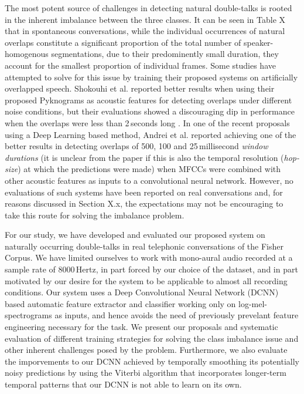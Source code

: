 \documentclass[a4paper]{article}
\begin{document}
The most potent source of challenges in detecting natural double-talks is rooted in the inherent imbalance between the three classes.
It can be seen in Table X that in spontaneous conversations,  %
while the individual occurrences of natural overlaps constitute a significant proportion of the total number of speaker-homogenous segmentations,
due to their predominently small duration, they account for the smallest proportion of individual frames.
Some studies have attempted to solve for this issue by training their proposed systems on artificially overlapped speech.  %
Shokouhi et al. reported better results when using their proposed Pyknograms as acoustic features for detecting overlaps under different noise conditions,
but their evaluations showed a discouraging dip in performance when the overlaps were less than 2\,seconds long \cite{shokouhi_teager_2017}.
In one of the recent proposals using a Deep Learning based method,
Andrei et al. reported achieving one of the better results in detecting overlaps of 500, 100 and 25\,millisecond \textit{window durations} \cite{AndreiDetectingOverlappedSpeech2017}
(it is unclear from the paper if this is also the temporal resolution (\textit{hop-size}) at which the predictions were made)
when MFCCs were combined with other acoustic features as inputs to a convolutional neural network.
However, no evaluations of such systems have been reported on real conversations and,
for reasons discussed in Section X.x, %
the expectations may not be encouraging to take this route for solving the imbalance problem.

For our study, we have developed and evaluated our proposed system on naturally occurring double-talks in real telephonic conversations of the Fisher Corpus.  %
We have limited ourselves to work with mono-aural audio recorded at a sample rate of 8000\,Hertz,
in part forced by our choice of the dataset,
and in part motivated by our desire for the system to be applicable to almost all recording conditions.
Our system uses a Deep Convolutional Neural Network (DCNN) based automatic feature extractor and classifier working only on log-mel-spectrograms as inputs,
and hence avoids the need of previously prevelant feature engineering necessary for the task.
We present our proposals and systematic evaluation of different training strategies for solving the class imbalance issue and other inherent challenges posed by the problem.
Furthermore, we also evaluate the imporvements to our DCNN achieved by temporally smoothing its potentially noisy predictions
by using the Viterbi algorithm that incorporates longer-term temporal patterns that our DCNN is not able to learn on its own.
\end{document}
